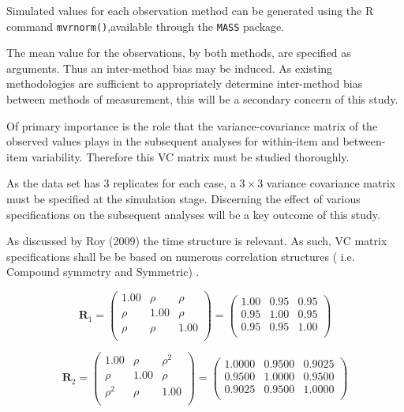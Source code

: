 Simulated values for each observation method can be generated using the R command  \texttt{mvrnorm()},available through the \texttt{MASS} package.

The mean value for the observations, by both methods, are specified as arguments. Thus an inter-method bias may be induced.  As existing methodologies are sufficient to appropriately determine inter-method bias between methods of measurement,  this will be a secondary concern of this study.

Of primary importance is the role that the variance-covariance matrix of the observed values plays in the subsequent analyses for within-item and between-item variability. Therefore this VC matrix must be studied thoroughly.

As the data set has 3 replicates for each case, a $3 \times  3$ variance covariance matrix must be specified at the simulation stage.  Discerning the effect of various specifications on the subsequent analyses will be a key outcome of this study.

As discussed by Roy (2009) the time structure is relevant. As such,  VC matrix specifications shall be be based on numerous correlation structures ( i.e. Compound symmetry and Symmetric) .

\[
\boldsymbol{R}_1 = \left(\begin{array}{ccc}
1.00 & \rho & \rho \\
\rho & 1.00 & \rho \\
\rho & \rho & 1.00\\
\end{array} \right)
=
\left(\begin{array}{ccc}
1.00 & 0.95 & 0.95 \\
0.95 & 1.00 & 0.95 \\
0.95 & 0.95 & 1.00\\
\end{array} \right)\]


\[ \boldsymbol{R}_2 = \left(\begin{array}{ccc}
1.00 & \rho & \rho^2 \\
\rho & 1.00 & \rho \\
\rho^2 & \rho & 1.00\\
\end{array} \right)
=
\left(\begin{array}{ccc}
1.0000 & 0.9500 & 0.9025 \\
0.9500 & 1.0000 & 0.9500 \\
0.9025 & 0.9500 & 1.0000 \\
\end{array} \right)\]

